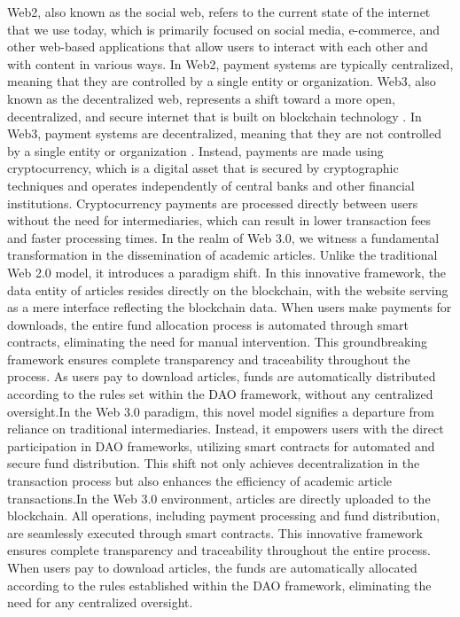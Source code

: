 \documentclass[lettersize,journal]{IEEEtran}
\begin{document}
Web2, also known as the social web, refers to the current state of the internet that we use today, which is primarily focused on social media, e-commerce, and other web-based applications that allow users to interact with each other and with content in various ways. In Web2, payment systems are typically centralized, meaning that they are controlled by a single entity or organization. 
Web3, also known as the decentralized web, represents a shift toward a more open, decentralized, and secure internet that is built on blockchain technology \cite{alabdulwahhab2018web}. In Web3, payment systems are decentralized, meaning that they are not controlled by a single entity or organization \cite{cao2022decentralized}. Instead, payments are made using cryptocurrency, which is a digital asset that is secured by cryptographic techniques and operates independently of central banks and other financial institutions. Cryptocurrency payments are processed directly between users without the need for intermediaries, which can result in lower transaction fees and faster processing times.
In the realm of Web 3.0, we witness a fundamental transformation in the dissemination of academic articles. Unlike the traditional Web 2.0 model, it introduces a paradigm shift. In this innovative framework, the data entity of articles resides directly on the blockchain, with the website serving as a mere interface reflecting the blockchain data. When users make payments for downloads, the entire fund allocation process is automated through smart contracts, eliminating the need for manual intervention. This groundbreaking framework ensures complete transparency and traceability throughout the process. As users pay to download articles, funds are automatically distributed according to the rules set within the DAO framework, without any centralized oversight.In the Web 3.0 paradigm, this novel model signifies a departure from reliance on traditional intermediaries. Instead, it empowers users with the direct participation in DAO frameworks, utilizing smart contracts for automated and secure fund distribution. This shift not only achieves decentralization in the transaction process but also enhances the efficiency of academic article transactions.In the Web 3.0 environment, articles are directly uploaded to the blockchain. All operations, including payment processing and fund distribution, are seamlessly executed through smart contracts. This innovative framework ensures complete transparency and traceability throughout the entire process. When users pay to download articles, the funds are automatically allocated according to the rules established within the DAO framework, eliminating the need for any centralized oversight.
\end{document}
